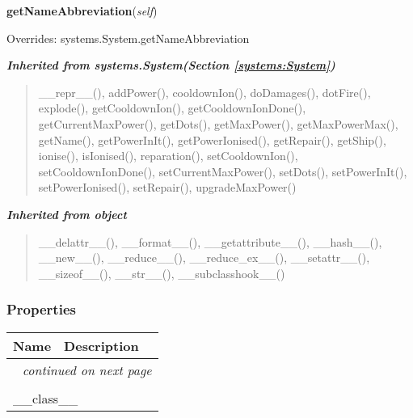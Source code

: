     \vspace{0.5ex}

\hspace{.8\funcindent}\begin{boxedminipage}{\funcwidth}

    \raggedright \textbf{getNameAbbreviation}(\textit{self})

\setlength{\parskip}{2ex}
\setlength{\parskip}{1ex}
      Overrides: systems.System.getNameAbbreviation

    \end{boxedminipage}


\large{\textbf{\textit{Inherited from systems.System\textit{(Section \ref{systems:System})}}}}

\begin{quote}
\_\_repr\_\_(), addPower(), cooldownIon(), doDamages(), dotFire(), explode(), getCooldownIon(), getCooldownIonDone(), getCurrentMaxPower(), getDots(), getMaxPower(), getMaxPowerMax(), getName(), getPowerInIt(), getPowerIonised(), getRepair(), getShip(), ionise(), isIonised(), reparation(), setCooldownIon(), setCooldownIonDone(), setCurrentMaxPower(), setDots(), setPowerInIt(), setPowerIonised(), setRepair(), upgradeMaxPower()
\end{quote}

\large{\textbf{\textit{Inherited from object}}}

\begin{quote}
\_\_delattr\_\_(), \_\_format\_\_(), \_\_getattribute\_\_(), \_\_hash\_\_(), \_\_new\_\_(), \_\_reduce\_\_(), \_\_reduce\_ex\_\_(), \_\_setattr\_\_(), \_\_sizeof\_\_(), \_\_str\_\_(), \_\_subclasshook\_\_()
\end{quote}


  \subsubsection{Properties}

    \vspace{-1cm}
\hspace{\varindent}\begin{longtable}{|p{\varnamewidth}|p{\vardescrwidth}|l}
\cline{1-2}
\cline{1-2} \centering \textbf{Name} & \centering \textbf{Description}& \\
\cline{1-2}
\endhead\cline{1-2}\multicolumn{3}{r}{\small\textit{continued on next page}}\\\endfoot\cline{1-2}
\endlastfoot\multicolumn{2}{|l|}{\textit{Inherited from object}}\\
\multicolumn{2}{|p{\varwidth}|}{\raggedright \_\_class\_\_}\\
\cline{1-2}
\end{longtable}

